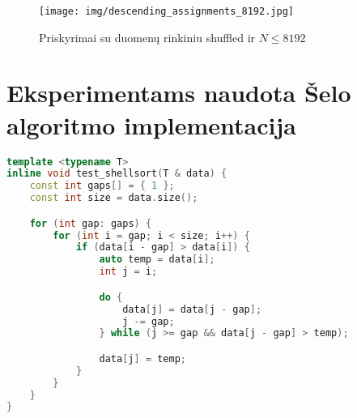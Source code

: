 \documentclass{VUMIFInfBakalaurinis}
\begin{document}
\begin{figure}[H]
  \centering
  \texttt{[image: img/descending\_assignments\_8192.jpg]}
  \caption{Priskyrimai su duomenų rinkiniu shuffled ir $N \leq 8192$}
  \label{img:descending_assignments_8192}
\end{figure}




\printbibliography[heading=bibintoc]

\appendix  %

\section{Eksperimentams naudota Šelo algoritmo implementacija}

\begin{lstlisting}[label={alg:test_shellsort},language=C++]
template <typename T>
inline void test_shellsort(T & data) {
    const int gaps[] = { 1 };
    const int size = data.size();

    for (int gap: gaps) {
        for (int i = gap; i < size; i++) {
            if (data[i - gap] > data[i]) {
                auto temp = data[i];
                int j = i;

                do {
                    data[j] = data[j - gap];
                    j -= gap;
                } while (j >= gap && data[j - gap] > temp);

                data[j] = temp;
            }
        }
    }
}
\end{lstlisting}
\end{document}
